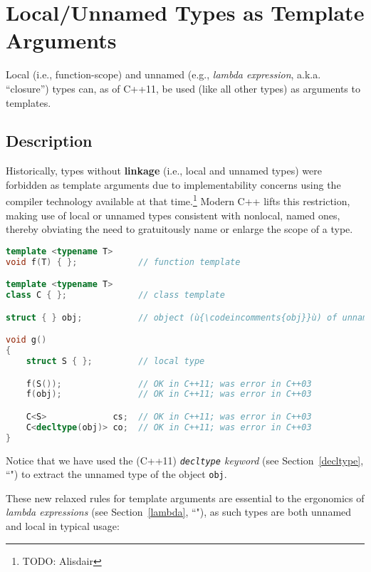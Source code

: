 \newpage
\section[Local Types '11]{Local/Unnamed Types as Template Arguments}\label{local-types-as-template-arguments}

Local (i.e., function-scope) and unnamed (e.g., \textit{lambda
expression}, a.k.a. ``closure'') types can, as of C++11, be used (like all other
types) as arguments to templates.

\subsection[Description]{Description}\label{description}

Historically, types without \textbf{linkage} (i.e., local and unnamed
types) were forbidden as template arguments due to implementability
concerns using the compiler technology available at that
time.{\cprotect\footnote{TODO: Alisdair}} Modern C++ lifts this
restriction, making use of local or unnamed types consistent with
nonlocal, named ones, thereby obviating the need to gratuitously name
or enlarge the scope of a type.

\begin{lstlisting}[language=C++]
template <typename T>
void f(T) { };            // function template

template <typename T>
class C { };              // class template

struct { } obj;           // object (ù{\codeincomments{obj}}ù) of unnamed C++ type

void g()
{
    struct S { };         // local type

    f(S());               // OK in C++11; was error in C++03
    f(obj);               // OK in C++11; was error in C++03

    C<S>             cs;  // OK in C++11; was error in C++03
    C<decltype(obj)> co;  // OK in C++11; was error in C++03
}
\end{lstlisting}

\noindent Notice that we have used the (C++11) {\it \texttt{decltype}
keyword} (see Section~\ref{decltype}, ``") to extract the unnamed type of the object \texttt{obj}.

These new relaxed rules for template arguments are essential to the
ergonomics of {\it lambda expressions} (see Section~\ref{lambda}, ``"), as such types are both
unnamed and local in typical usage:

